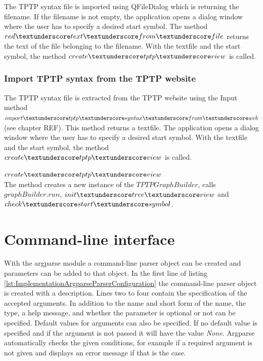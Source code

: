 The \ac{TPTP} syntax file is imported using QFileDialog which is returning the filename. If the filename is not empty, the application opens a dialog window where the user has to specify a desired start symbol. The method $red\textunderscore text\textunderscore from\textunderscore file$ returns the text of the file belonging to the filename. With the textfile and the start symbol, the method $create\textunderscore tptp\textunderscore view$ is called.

\subsubsection{Import \ac{TPTP} syntax from the \ac{TPTP} website}\label{sec:ImplementationGUIImportInternet}

The \ac{TPTP} syntax file is extracted from the \ac{TPTP} website using the Input method $import\textunderscore tptp\textunderscore syntax\textunderscore from\textunderscore web$ (see chapter REF). This method returns a textfile. The application opens a dialog window where the user has to specify a desired start symbol. With the textfile and the start symbol, the method $create\textunderscore tptp\textunderscore view$ is called.

$create\textunderscore tptp\textunderscore view$ \\
The method creates a new instance of the $TPTPGraphBuilder$, calls $graphBuilder.run$, $init\textunderscore tree\textunderscore view$ and $check\textunderscore start\textunderscore symbol$.

\section{Command-line interface}\label{sec:ImplementationCommandLineInterface}
With the argparse module a command-line parser object can be created and parameters can be added to that object.
In the first line of listing \ref{lst:ImplementationArgparseParserConfiguration} the command-line parser object is created with a description.
Lines two to four contain the specification of the accepted arguments.
In addition to the name and short form of the name, the type, a help message, and whether the parameter is optional or not can be specified.
Default values for arguments can also be specified.
If no default value is specified and if the argument is not passed it will have the value \textit{None}.
Argparse automatically checks the given conditions, for example if a required argument is not given and displays an error message if that is the case.

